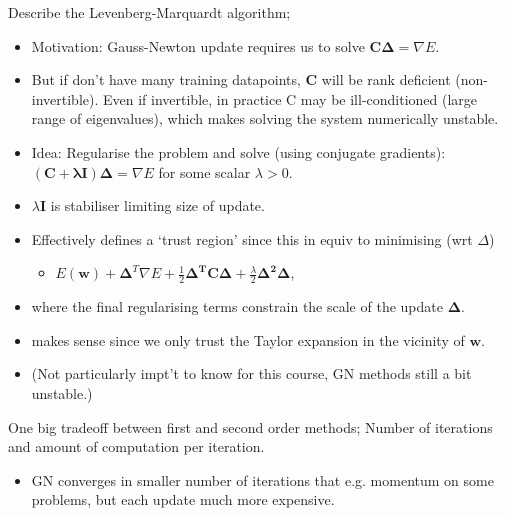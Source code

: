 \documentclass{article}
\begin{document}
Describe the Levenberg-Marquardt algorithm; \begin{itemize}
	\item Motivation: Gauss-Newton update requires us to solve $\mathbf{C\Delta} = \nabla E$. 
	\item But if don't have many training datapoints, $\mathbf{C}$ will be rank deficient (non-invertible). Even if invertible, in practice C may be ill-conditioned (large range of eigenvalues), which makes solving the system numerically unstable.
	\item Idea: Regularise the problem and solve (using conjugate gradients): $(\mathbf{C+\lambda I})\mathbf{\Delta}=\nabla E$ for some scalar $\lambda > 0$.
	\item $\lambda \mathbf{I}$ is stabiliser limiting size of update.
	\item Effectively defines a `trust region' since this in equiv to minimising (wrt $\Delta$) \begin{itemize}
		\item $E(\mathbf{w}) + \mathbf{\Delta}^T\nabla E + \frac{1}{2}\mathbf{\Delta^TC\Delta} + \frac{\lambda}{2}\mathbf{\Delta^2\Delta}$,
	\end{itemize} \item where the final regularising terms constrain the scale of the update $\mathbf{\Delta}$.
\item makes sense since we only trust the Taylor expansion in the vicinity of $\mathbf{w}$.
\item (Not particularly impt't to know for this course, GN methods still a bit unstable.)
\end{itemize}

One big tradeoff between first and second order methods; Number of iterations and amount of computation per iteration. \begin{itemize}
	\item GN converges in smaller number of iterations that e.g. momentum on some problems, but each update much more expensive.
\end{itemize}
\end{document}
